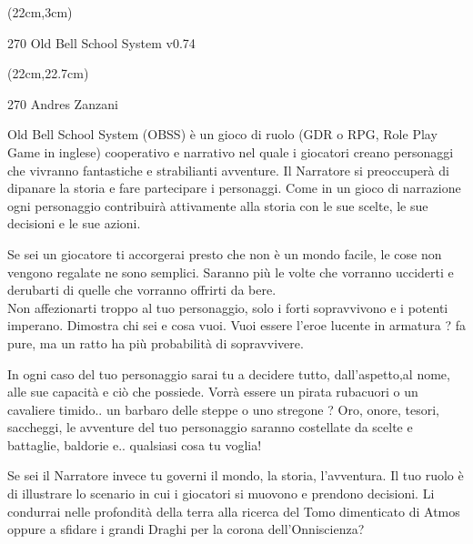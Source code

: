 \documentclass[10pt,a4paper]{article}
\def \versione {0.74}
\begin{document}
\begin{textblock*}{2cm}(22cm,3cm) %
\begin{turn}{270}
	{\Huge Old Bell School System v\versione}\\
\end{turn}
\end{textblock*}


\begin{textblock*}{2cm}(22cm,22.7cm) %
\begin{turn}{270}
	{\Huge Andres Zanzani}
\end{turn}
\end{textblock*}



Old Bell School System (OBSS) è un gioco di ruolo (GDR o RPG, Role Play Game in inglese) cooperativo e narrativo nel quale i giocatori creano personaggi che vivranno fantastiche e strabilianti avventure. Il Narratore si preoccuperà di dipanare la storia e fare partecipare i personaggi. Come in un gioco di narrazione ogni personaggio contribuirà attivamente alla storia con le sue scelte, le sue decisioni e le sue azioni.

Se sei un giocatore ti accorgerai presto che non è un mondo facile, le cose non vengono regalate ne sono semplici. Saranno più le volte che vorranno ucciderti e derubarti di quelle che vorranno offrirti da bere.\\
Non affezionarti troppo al tuo personaggio, solo i forti sopravvivono e i potenti imperano. Dimostra chi sei e cosa vuoi. Vuoi essere l'eroe lucente in armatura ? fa pure, ma un ratto ha più probabilità di sopravvivere.

In ogni caso del tuo personaggio sarai tu a decidere tutto, dall'aspetto,al nome, alle sue capacità e ciò che possiede. Vorrà essere un pirata rubacuori o un cavaliere timido.. un barbaro delle steppe o uno stregone ? Oro, onore, tesori, saccheggi, le avventure del tuo personaggio saranno costellate da scelte e battaglie, baldorie e.. qualsiasi cosa tu voglia!

Se sei il Narratore invece tu governi il mondo,  la storia, l'avventura. Il tuo ruolo è di illustrare lo scenario in cui i giocatori si muovono e prendono decisioni. Li condurrai nelle profondità della terra alla ricerca del Tomo dimenticato di Atmos oppure a sfidare i grandi Draghi per la corona dell'Onniscienza?
\end{document}
